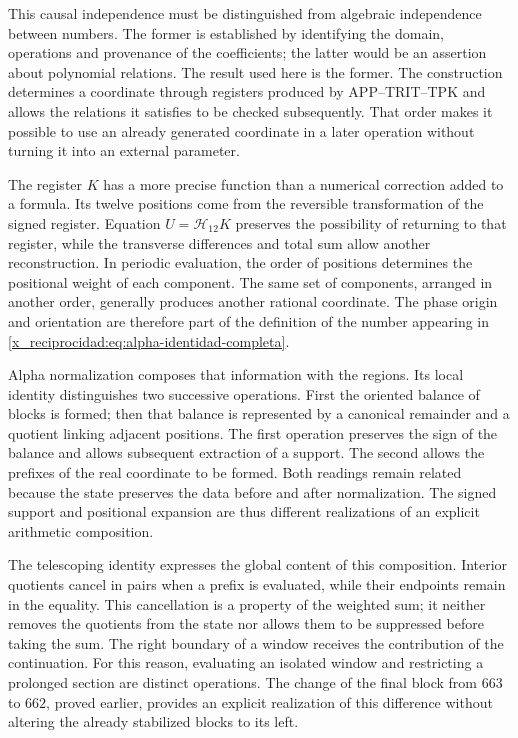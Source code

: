 This causal independence must be distinguished from algebraic independence
between numbers. The former is established by identifying the domain,
operations and provenance of the coefficients; the latter would be an
assertion about polynomial relations. The result used here is the
former. The construction determines a coordinate through registers
produced by APP--TRIT--TPK and allows the relations it satisfies to be checked
subsequently. That order makes it possible to use an already generated
coordinate in a later operation without turning it into an external parameter.

The register $K$ has a more precise function than a numerical
correction added to a formula. Its twelve positions come from the
reversible transformation of the signed register. Equation
$U=\mathcal H_{12}K$ preserves the possibility of returning to that register,
while the transverse differences and total sum allow another
reconstruction. In periodic evaluation, the order of positions
determines the positional weight of each component. The same set of
components, arranged in another order, generally produces another rational
coordinate. The phase origin and orientation are therefore part of the
definition of the number appearing in \eqref{x_reciprocidad:eq:alpha-identidad-completa}.

Alpha normalization composes that information with the regions. Its
local identity distinguishes two successive operations. First the
oriented balance of blocks is formed; then that balance is represented by
a canonical remainder and a quotient linking adjacent positions. The first
operation preserves the sign of the balance and allows subsequent extraction
of a support. The second allows the prefixes of the real coordinate to
be formed. Both readings remain related because the state preserves the
data before and after normalization. The signed support and
positional expansion are thus different realizations of an explicit arithmetic
composition.

The telescoping identity expresses the global content of this composition.
Interior quotients cancel in pairs when a prefix is evaluated,
while their endpoints remain in the equality. This cancellation is a
property of the weighted sum; it neither removes the quotients from the state nor
allows them to be suppressed before taking the sum. The right boundary of a
window receives the contribution of the continuation. For this reason,
evaluating an isolated window and restricting a prolonged
section are distinct operations. The change of the final block from $663$ to
$662$, proved earlier, provides an explicit realization of this
difference without altering the already stabilized blocks to its left.

